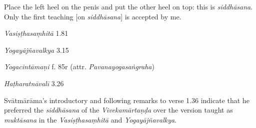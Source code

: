 \begin{ekdosis}
\begin{translation}[hp01_036]
Place the left heel on the penis and put the other heel on top: this is \emph{siddhāsana}.\\ 

Only the first teaching [on \emph{siddhāsana}] is accepted by me.\\

\end{translation}

\begin{sources}[hp01_036]
\emph{Vasiṣṭhasaṃhitā} 1.81

\begin{versinnote}
\end{versinnote}

\emph{Yogayājñavalkya} 3.15

\begin{versinnote}
\end{versinnote}

\end{sources}

\begin{testimonia}[hp01_036]
\emph{Yogacintāmaṇi} f. 85r (attr. \emph{Pavanayogasaṅgraha})

\begin{versinnote}
\end{versinnote}

\emph{Haṭharatnāvalī} 3.26

\begin{versinnote}
\end{versinnote}

\end{testimonia}

\begin{philcomm}[hp01_036]
Svātmārāma's introductory and following remarks to verse 1.36 indicate that he preferred the \emph{siddhāsana} of the \emph{Vivekamārtaṇḍa} over the version taught as \emph{muktāsana} in the \emph{Vasiṣṭhasaṃhitā} and \emph{Yogayājñavalkya}.
\end{philcomm}

\end{ekdosis}
